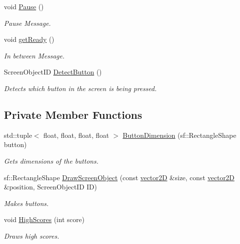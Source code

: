 \begin{DoxyCompactItemize}
\mbox{\label{class_splash_screen_a8a91ffe9d78177da94607a9876621850}} 
void \mbox{\hyperlink{class_splash_screen_a8a91ffe9d78177da94607a9876621850}{Pause}} ()
\begin{DoxyCompactList}\small\item\em Pause Message. \end{DoxyCompactList}\item 
\mbox{\label{class_splash_screen_a98a24e3b73ea0c4500cb6a50316509ba}} 
void \mbox{\hyperlink{class_splash_screen_a98a24e3b73ea0c4500cb6a50316509ba}{get\+Ready}} ()
\begin{DoxyCompactList}\small\item\em In between Message. \end{DoxyCompactList}\item 
Screen\+Object\+ID \mbox{\hyperlink{class_splash_screen_a9ee25ec3f5cf41323a5fc4f99b2b1016}{Detect\+Button}} ()
\begin{DoxyCompactList}\small\item\em Detects which button in the screen is being pressed. \end{DoxyCompactList}\end{DoxyCompactItemize}
\subsection*{Private Member Functions}
\begin{DoxyCompactItemize}
\item 
std\+::tuple$<$ float, float, float, float $>$ \mbox{\hyperlink{class_splash_screen_aee2130b85a0f8850816f155cf8c4800b}{Button\+Dimension}} (sf\+::\+Rectangle\+Shape button)
\begin{DoxyCompactList}\small\item\em Gets dimensions of the buttons. \end{DoxyCompactList}\item 
sf\+::\+Rectangle\+Shape \mbox{\hyperlink{class_splash_screen_af34b1a6b28c5fe8f4124ff7d94be6c55}{Draw\+Screen\+Object}} (const \mbox{\hyperlink{classvector2_d}{vector2D}} \&size, const \mbox{\hyperlink{classvector2_d}{vector2D}} \&position, Screen\+Object\+ID ID)
\begin{DoxyCompactList}\small\item\em Makes buttons. \end{DoxyCompactList}\item 
void \mbox{\hyperlink{class_splash_screen_ae617c148840201b21946e718414748f4}{High\+Scores}} (int score)
\begin{DoxyCompactList}\small\item\em Draws high scores. \end{DoxyCompactList}\end{DoxyCompactItemize}
